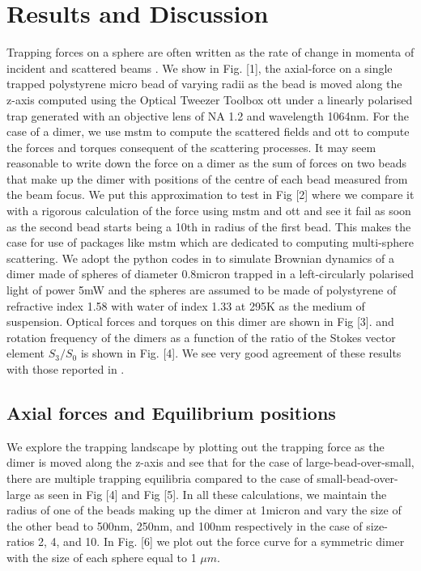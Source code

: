 \documentclass[preprint,  3p]{elsarticle}
\begin{document}
\section{Results and Discussion}
Trapping forces on a sphere are often written as the rate of change in momenta of incident and scattered beams \cite{Nieminen_2007}. We show in Fig. [1], the axial-force on a single trapped polystyrene micro bead of varying radii as the bead is moved along the z-axis computed using the Optical Tweezer Toolbox ott under a linearly polarised trap generated with an objective lens of NA 1.2 and wavelength 1064nm. For the case of a dimer, we use mstm to compute the scattered fields and ott to compute the forces and torques consequent of the scattering processes. It may seem reasonable to write down the force on a dimer as the sum of forces on two beads that make up the dimer with positions of the centre of each bead measured from the beam focus. We put this approximation to test in Fig [2] where we compare it with a rigorous calculation of the force using mstm and ott and see it fail as soon as the second bead starts being a 10th in radius of the first bead. This makes the case for use of packages like mstm which are dedicated to computing multi-sphere scattering. We adopt the python codes in \cite{Vigilante_2020} to simulate Brownian dynamics of a dimer made of spheres of diameter 0.8micron trapped in a left-circularly polarised light of power 5mW and the spheres are assumed to be made of polystyrene of refractive index 1.58 with water of index 1.33 at 295K as the medium of suspension. Optical forces and torques on this dimer are shown in Fig [3].  and rotation frequency of the dimers as a function of the ratio of the Stokes vector element $S_3/S_0$ is shown in Fig. [4]. We see very good agreement of these results with those reported in \cite{Vigilante_2020}. 

\subsection{Axial forces and Equilibrium positions}
We explore the trapping landscape by plotting out the trapping force as the dimer is moved along the z-axis and see that for the case of large-bead-over-small, there are multiple trapping equilibria compared to the case of small-bead-over-large as seen in Fig [4] and Fig [5]. In all these calculations, we maintain the radius of one of the beads making up the dimer at 1micron and vary the size of the other bead to 500nm, 250nm, and 100nm respectively in the case of size-ratios 2, 4, and 10. In Fig. [6] we plot out the force curve for a symmetric dimer with the size of each sphere equal to 1 $\mu m$.  
\end{document}
